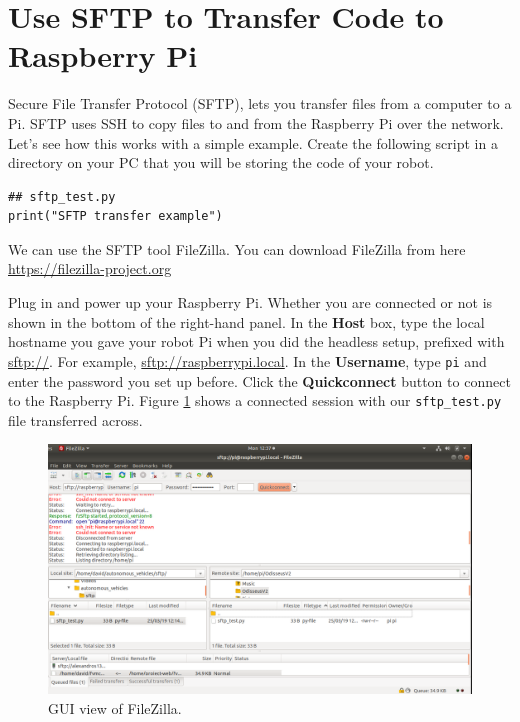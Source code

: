 \section{Use SFTP to Transfer Code to Raspberry Pi}
\label{use_sftp_transfer_code_raspberrypi}

Secure File Transfer Protocol (SFTP), lets you transfer files from a computer to a Pi. SFTP uses SSH to
copy files to and from the Raspberry Pi over the network. Let's see how this works with a simple
example. Create the following script in a directory on your PC that you will be storing the code
of your robot.

\begin{lstlisting}
## sftp_test.py
print("SFTP transfer example")
\end{lstlisting}

We can use the SFTP tool FileZilla. You can download FileZilla from here \url{https:/​/​filezilla-​project.​org} 

Plug in and power up your Raspberry Pi. Whether you are connected or not is shown  in the bottom of the right-hand panel.
In the \textbf{Host} box, type the local hostname you gave your robot Pi when you did the headless setup, prefixed with \url{sftp://}. 
For example, \url{sftp://raspberrypi.local}. In the \textbf{Username}, type \lstinline{pi} and enter the password you set up before. Click the 
\textbf{Quickconnect} button to connect to the Raspberry Pi. Figure \ref{raspberrypi_sftp} shows a connected session with
our \lstinline{sftp_test.py} file transferred across.

\begin{figure}[!htb]
\begin{center}
\includegraphics[scale=0.280]{img/raspberrypi/sftp.png}
\end{center}
\caption{GUI view of FileZilla.}
\label{raspberrypi_sftp}
\end{figure}

